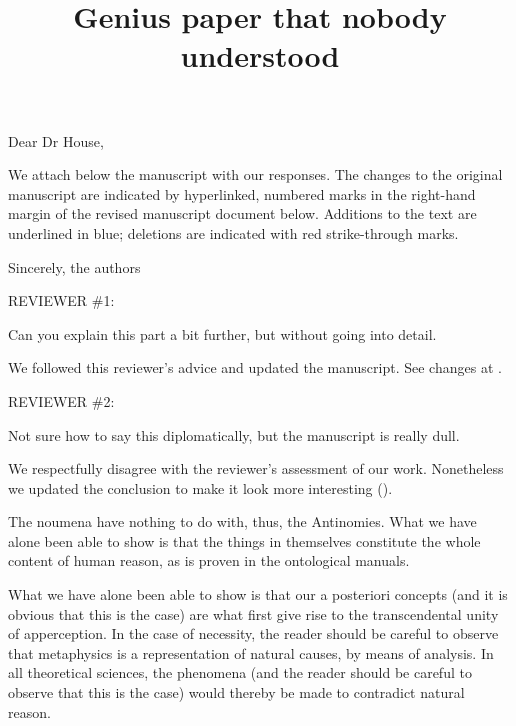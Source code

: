 \documentclass{article}
\title{Genius paper that nobody understood}
\begin{document}
\begin{DIFnomarkup}

Dear Dr House,

We attach below the manuscript with our responses. The changes to the original manuscript are indicated by hyperlinked, numbered marks in the right-hand margin of the revised manuscript document below. Additions to the text are underlined in blue; deletions are indicated with red strike-through marks.

Sincerely, the authors

\startreview
\vspace{3cm}
REVIEWER \#1:

Can you explain this part a bit further, but without going into detail.

\us

We followed this reviewer's advice and updated the manuscript.
See changes at .

\them

\vspace{3cm}
REVIEWER \#2:

Not sure how to say this diplomatically, but the manuscript is really dull.

\us

We respectfully disagree with the reviewer's assessment of our work.
Nonetheless we updated the conclusion to make it look more interesting ().

\stopreview\end{DIFnomarkup}

\maketitle

\kant[1]

The noumena have nothing to do with, thus, the Antinomies. What we
have alone been able to show is that the things in themselves constitute the
whole content of human reason, as is proven in the ontological manuals.

\kant[2]

What we have alone been able to show is that our a posteriori concepts (and
it is obvious that this is the case) are what first give rise to the transcendental
unity of apperception. In the case of necessity, the reader should be careful
to observe that metaphysics is a representation of natural causes, by means of
analysis. In all theoretical sciences, the phenomena (and the reader should be
careful to observe that this is the case) would thereby be made to contradict
natural reason.
\end{document}
